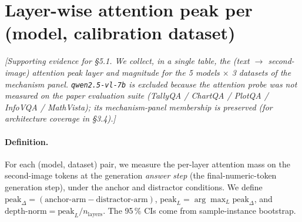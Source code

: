 \documentclass[11pt]{article}
\newcommand{\todoNote}[1]{\textit{\textcolor[rgb]{0.45,0.45,0.45}{[#1]}}}
\begin{document}
\section{Layer-wise attention peak per (model, calibration dataset)}
\label{app:attention-peak}

\todoNote{Supporting evidence for \S5.1. We collect, in a single table, the (text $\rightarrow$ second-image) attention peak layer and magnitude for the 5 models $\times$ 3 datasets of the mechanism panel. \texttt{qwen2.5-vl-7b} is excluded because the attention probe was not measured on the paper evaluation suite (TallyQA / ChartQA / PlotQA / InfoVQA / MathVista); its mechanism-panel membership is preserved (for architecture coverage in \S3.4).}

\paragraph{Definition.} For each (model, dataset) pair, we measure the per-layer attention mass on the second-image tokens at the generation \textit{answer step} (the final-numeric-token generation step), under the anchor and distractor conditions. We define $\text{peak}_\Delta = (\text{anchor-arm} - \text{distractor-arm})$, $\text{peak}_L = \arg\max_L \text{peak}_\Delta$, and $\text{depth-norm} = \text{peak}_L / n_\text{layers}$. The 95\,\% CIs come from sample-instance bootstrap.
\end{document}
